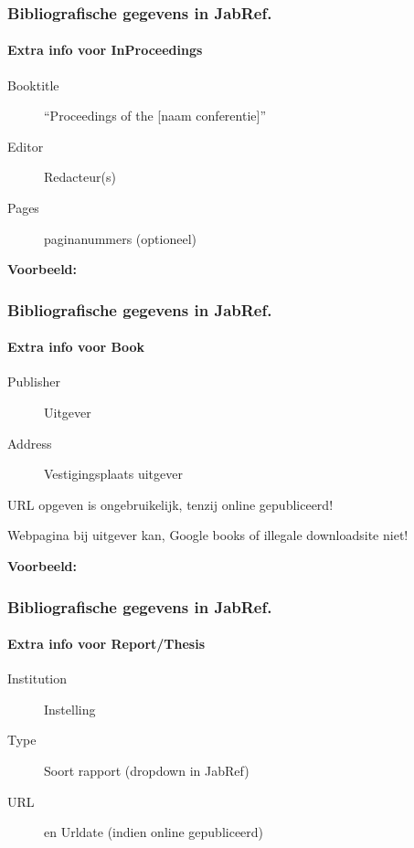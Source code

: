 \documentclass[aspectratio=169]{beamer}
\begin{document}
\begin{frame}[plain]
  \frametitle{Bibliografische gegevens in JabRef.}
  \framesubtitle{Extra info voor InProceedings}

  \begin{description}
    \item[Booktitle] ``Proceedings of the [naam conferentie]''
    \item[Editor] Redacteur(s)
    \item[Pages] paginanummers (optioneel)
  \end{description}

  \medskip

  \textbf{Voorbeeld:}

\end{frame}

\begin{frame}[plain]
  \frametitle{Bibliografische gegevens in JabRef.}
  \framesubtitle{Extra info voor Book}

  \begin{description}
    \item[Publisher] Uitgever
    \item[Address] Vestigingsplaats uitgever
  \end{description}

  \medskip

  URL opgeven is ongebruikelijk, tenzij online gepubliceerd!
  
  Webpagina bij uitgever kan, Google books of illegale downloadsite niet!

  \medskip

  \textbf{Voorbeeld:}

\end{frame}


\begin{frame}
  \frametitle{Bibliografische gegevens in JabRef.}
  \framesubtitle{Extra info voor Report/Thesis}

  \begin{description}
    \item[Institution] Instelling
    \item[Type] Soort rapport (dropdown in JabRef)
    \item[URL]  en Urldate (indien online gepubliceerd)
  \end{description}

\end{frame}
\end{document}
